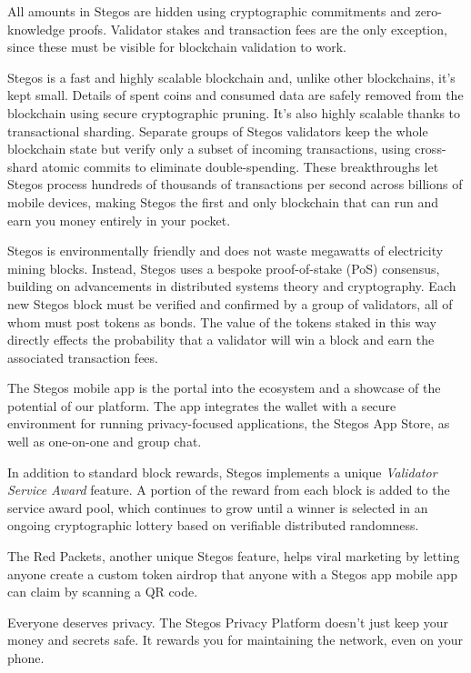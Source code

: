 \documentclass[a4paper, 10pt, conference]{ieeeconf}
\begin{document}
All amounts in Stegos are hidden using cryptographic commitments and zero-knowledge proofs. Validator stakes and transaction fees are the only exception, since these must be visible for blockchain validation to work. 

Stegos is a fast and highly scalable blockchain and, unlike other blockchains, it’s kept small. Details of spent coins and consumed data are safely removed from the blockchain using secure cryptographic pruning. It's also highly scalable thanks to transactional sharding. Separate groups of Stegos validators keep the whole blockchain state but verify only a subset of incoming transactions, using cross-shard atomic commits to eliminate double-spending. These breakthroughs let Stegos process hundreds of thousands of transactions per second across billions of mobile devices, making Stegos the first and only blockchain that can run and earn you money entirely in your pocket.

Stegos is environmentally friendly and does not waste megawatts of electricity mining blocks. Instead, Stegos uses a bespoke proof-of-stake (PoS) consensus, building on advancements in distributed systems theory and cryptography. Each new Stegos block must be verified and confirmed by a group of validators, all of whom must post tokens as bonds. The value of the tokens staked in this way directly effects the probability that a validator will win a block and earn the associated transaction fees. 

The Stegos mobile app is the portal into the ecosystem and a showcase of the potential of our platform. The app integrates the wallet with a secure environment for running privacy-focused applications, the Stegos App Store, as well as one-on-one and group chat.

In addition to standard block rewards, Stegos implements a unique \textit{Validator Service Award} feature. A portion of the reward from each block is added to the service award pool, which continues to grow until a winner is selected in an ongoing cryptographic lottery based on verifiable distributed randomness. 

The Red Packets, another unique Stegos feature, helps viral marketing by letting anyone create a custom token airdrop that anyone with a Stegos app mobile app can claim by scanning a QR code.

Everyone deserves privacy. The Stegos Privacy Platform doesn’t just keep your money and secrets safe. It rewards you for maintaining the network, even on your phone.    
\end{document}
